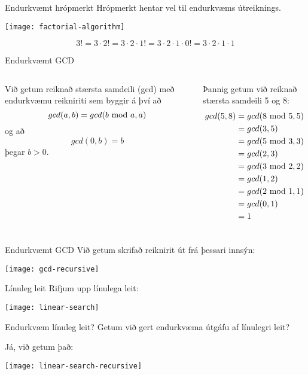 \documentclass[handout]{beamer}
\begin{document}
\begin{frame}{Endurkvæmt hrópmerkt}
Hrópmerkt hentar vel til endurkvæms útreiknings.
\begin{center}
\texttt{[image: factorial-algorithm]}
\end{center}
\pause
\[
3! = 3\cdot 2! = 3 \cdot 2 \cdot 1! = 3 \cdot 2 \cdot 1 \cdot 0! = 3 \cdot 2 \cdot 1 \cdot 1
\]
\end{frame}

\begin{frame}{Endurkvæmt GCD}
\begin{columns}
Við getum reiknað stærsta samdeili (gcd) með endurkvæmu reikniriti sem byggir á því að 
\[
 gcd(a,b) = gcd(b \ \text{mod}\ a, a)
\]
og að 
\[
 gcd(0,b) = b
\]
þegar $b > 0$.

\vspace{0.5cm}
Þannig getum við reiknað stærsta samdeili 5 og 8:
\begin{align*}
gcd(5,8) &= gcd(8 \ \text{mod}\ 5, 5)\\
&= gcd(3,5)\\
&= gcd(5 \ \text{mod}\ 3, 3)\\
&= gcd(2,3)\\
&= gcd(3 \ \text{mod}\ 2, 2)\\
&= gcd(1,2)\\
&= gcd(2 \ \text{mod}\ 1, 1)\\
&= gcd(0,1)\\
&= 1
\end{align*}

\end{columns}
\end{frame}

\begin{frame}{Endurkvæmt GCD}
Við getum skrifað reiknirit út frá þessari innsýn:
\begin{center}
\texttt{[image: gcd-recursive]}
\end{center}
\end{frame}

\begin{frame}{Línuleg leit}
Rifjum upp línulega leit:
\begin{center}
\texttt{[image: linear-search]}
\end{center}
\end{frame}

\begin{frame}{Endurkvæm línuleg leit?}
Getum við gert endurkvæma útgáfu af línulegri leit?\pause

Já, við getum það:
\begin{center}
\texttt{[image: linear-search-recursive]}
\end{center}
\end{frame}
\end{document}
